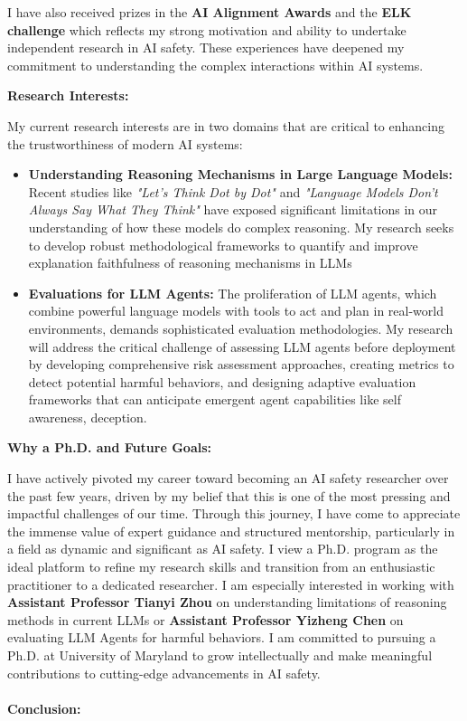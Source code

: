 \documentclass[12pt]{article}
\begin{document}
I have also received prizes in the \textbf{AI Alignment Awards} \cite{alignment_awards} and the \textbf{ELK challenge} \cite{elk_prize} which reflects my strong motivation and ability to undertake independent research in AI safety. These experiences have deepened my commitment to understanding the complex interactions within AI systems.

\textbf{Research Interests:}

My current research interests are in two domains that are critical to enhancing the trustworthiness of modern AI systems:

\begin{itemize}
    \item \textbf{Understanding Reasoning Mechanisms in Large Language Models:} 
    Recent studies like \emph{"Let's Think Dot by Dot"} \cite{pfau2024} and \emph{"Language Models Don't Always Say What They Think"} \cite{turpin2023} have exposed significant limitations in our understanding of how these models do complex reasoning. My research seeks to develop robust methodological frameworks to quantify and improve explanation faithfulness of reasoning mechanisms in LLMs
    
    \item \textbf{Evaluations for LLM Agents:}  
    The proliferation of LLM agents, which combine powerful language models with tools to act and plan in real-world environments, demands sophisticated evaluation methodologies. My research will address the critical challenge of assessing LLM agents before deployment by developing comprehensive risk assessment approaches, creating metrics to detect potential harmful behaviors, and designing adaptive evaluation frameworks that can anticipate emergent agent capabilities like self awareness, deception.
    
\end{itemize}

\newpage
\textbf{Why a Ph.D. and Future Goals:}

I have actively pivoted my career toward becoming an AI safety researcher over the past few years, driven by my belief that this is one of the most pressing and impactful challenges of our time. Through this journey, I have come to appreciate the immense value of expert guidance and structured mentorship, particularly in a field as dynamic and significant as AI safety. I view a Ph.D. program as the ideal platform to refine my research skills and transition from an enthusiastic practitioner to a dedicated researcher. I am especially interested in working with \textbf{Assistant Professor Tianyi Zhou} on understanding limitations of reasoning methods in current LLMs or \textbf{Assistant Professor Yizheng Chen} on evaluating LLM Agents for harmful behaviors. I am committed to pursuing a Ph.D. at University of Maryland to grow intellectually and make meaningful contributions to cutting-edge advancements in AI safety.
\\
\\
\textbf{Conclusion:}
\end{document}
